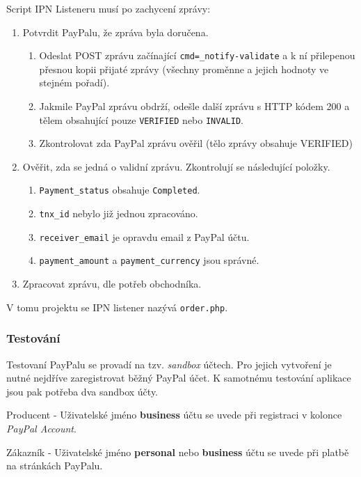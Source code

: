 \documentclass[12pt]{article}
\begin{document}
Script IPN Listeneru musí po zachycení zprávy:

\begin{enumerate}
\item Potvrdit PayPalu, že zpráva byla doručena.

  \begin{enumerate}
  \item Odeslat POST zprávu začínající \texttt{cmd=\_notify-validate} a k ní přilepenou přesnou kopii přijaté zprávy (všechny proměnne a jejich hodnoty ve stejném pořadí).
  \item Jakmile PayPal zprávu obdrží, odešle další zprávu s HTTP kódem 200 a tělem obsahující pouze \texttt{VERIFIED} nebo \texttt{INVALID}.
  \item Zkontrolovat zda PayPal zprávu ověřil (tělo zprávy obsahuje VERIFIED)
  \end{enumerate}

\item Ověřit, zda se jedná o validní zprávu. Zkontrolují se následující položky.

  \begin{enumerate}
  \item \texttt{Payment\_status} obsahuje \texttt{Completed}.
  \item \texttt{tnx\_id} nebylo již jednou zpracováno.
  \item \texttt{receiver\_email} je opravdu email z PayPal účtu.
  \item \texttt{payment\_amount} a \texttt{payment\_currency} jsou správné.
  \end{enumerate}

\item Zpracovat zprávu, dle potřeb obchodníka.
\end{enumerate}

V tomu projektu se IPN listener nazývá \texttt{order.php}.

\subsubsection{Testování}

Testovaní PayPalu se provadí na tzv. \emph{sandbox} účtech. Pro jejich vytvoření je nutné nejdříve zaregistrovat běžný PayPal účet.
K samotnému testování aplikace jsou pak potřeba dva sandbox účty.
\begin{description}
\item{Producent} - Uživatelské jméno \textbf{business} účtu se uvede při registraci v kolonce \emph{PayPal Account}.
\item{Zákazník} - Uživatelské jméno \textbf{personal} nebo \textbf{business} účtu se uvede při platbě na stránkách PayPalu.
\end{description}
\end{document}
